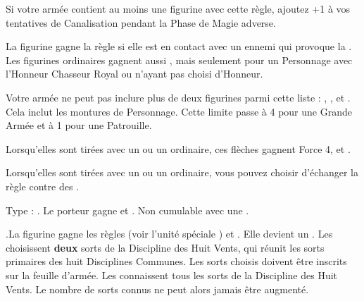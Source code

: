 \armyspecialruleentry{\masterofbalance}

Si votre armée contient au moins une figurine avec cette règle, ajoutez +1 à vos tentatives de Canalisation pendant la Phase de Magie adverse.

\armyspecialruleentry{\valiant}

La figurine gagne la règle \stubborn{} si elle est en contact avec un ennemi qui provoque la \fear{}. Les figurines ordinaires gagnent aussi \bodyguard{\highprince{}, \commander{}}, mais seulement pour un Personnage avec l’Honneur Chasseur Royal ou n'ayant pas choisi d'Honneur.

\armyspecialruleentry{\lastoftheirkind}

Votre armée ne peut pas inclure plus de deux figurines parmi cette liste : \youngdragon{}, \dragon{}, \firephoenixes{} et \frostphoenixes{}. Cela inclut les montures de Personnage. Cette limite passe à 4 pour une Grande Armée et à 1 pour une Patrouille.

\closearmyspecialrules

\vspace*{1.5cm}
\startarmyarmoury

\startitemlistonecol

\listitemonecol{\moonlightarrows}Lorsqu'elles sont tirées avec un \bow{} ou un \longbow{} ordinaire, ces flèches gagnent Force 4, \flamingattacks{} et \magicalattacks{}.

\listitemonecol{\bitterarrows}Lorsqu'elles sont tirées avec un \bow{} ou un \longbow{} ordinaire, vous pouvez choisir d'échanger la règle \volleyfire{} contre des \poisonedattacks{}. 

\listitemonecol{\dragonforgedarmour}Type : \ha{}. Le porteur gagne \fireborn{} et . Non cumulable avec une \lionsfur{}.

\enditemlistonecol

\closearmyarmoury








\startarmynewsection{\honours}

\vspace{0.5cm}

\hfill
{}\oneofakind{}.\vspace{5pt}\newline La figurine gagne les règles \swordsworn{} (voir l'unité spéciale \swordmasters{}) et \masterofbalance{}. Elle devient un \textbf{}. Les \commanders{} choisissent \textbf{deux} sorts de la Discipline des Huit Vents, qui réunit les sorts primaires des huit Disciplines Communes. Les sorts choisis doivent être inscrits sur la feuille d'armée. Les \highprinces{} connaissent tous les sorts de la Discipline des Huit Vents.\newline
Le nombre de sorts connus ne peut alors jamais être augmenté.
\honourmulticols{}
\def\tempmounts{À pied uniquement=,}
\vspace*{-0.3cm}\mounts{\tempmounts}\columnbreak\phantom{debug}
\honourclosesidetext{}


